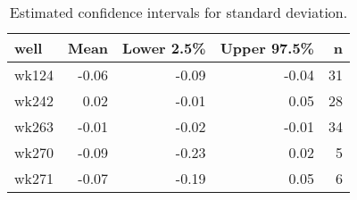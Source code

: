 \begin{table}[ht]
\centering
\begin{tabular}{lrrrr}
  \hline
well & Mean & Lower 2.5\% & Upper 97.5\% & n \\ 
  \hline
wk124 & -0.06 & -0.09 & -0.04 &  31 \\ 
  wk242 & 0.02 & -0.01 & 0.05 &  28 \\ 
  wk263 & -0.01 & -0.02 & -0.01 &  34 \\ 
  wk270 & -0.09 & -0.23 & 0.02 &   5 \\ 
  wk271 & -0.07 & -0.19 & 0.05 &   6 \\ 
   \hline
\end{tabular}
\caption{Estimated confidence intervals for standard deviation.} 
\label{tab:sd}
\end{table}
